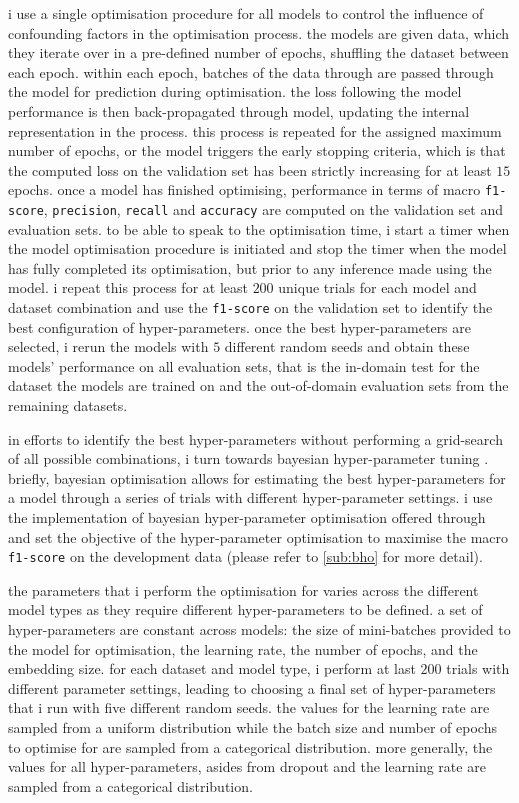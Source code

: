 i use a single optimisation procedure for all models to control the influence of confounding factors in the optimisation process.
the models are given data, which they iterate over in a pre-defined number of epochs, shuffling the dataset between each epoch.
within each epoch, batches of the data through are passed through the model for prediction during optimisation.
the loss following the model performance is then back-propagated through model, updating the internal representation in the process.
this process is repeated for the assigned maximum number of epochs, or the model triggers the early stopping \citep{prechelt:1998} criteria, which is that the computed loss on the validation set has been strictly increasing for at least $15$ epochs.
once a model has finished optimising, performance in terms of macro \texttt{f1-score}, \texttt{precision}, \texttt{recall} and \texttt{accuracy} are computed on the validation set and evaluation sets.
to be able to speak to the optimisation time, i start a timer when the model optimisation procedure is initiated and stop the timer when the model has fully completed its optimisation, but prior to any inference made using the model.
i repeat this process for at least $200$ unique trials for each model and dataset combination and use the \texttt{f1-score} on the validation set to identify the best configuration of hyper-parameters.
once the best hyper-parameters are selected, i rerun the models with $5$ different random seeds and obtain these models' performance on all evaluation sets, that is the in-domain test for the dataset the models are trained on and the out-of-domain evaluation sets from the remaining datasets.

in efforts to identify the best hyper-parameters without performing a grid-search of all possible combinations, i turn towards bayesian hyper-parameter tuning \citep{neal:1996}.
briefly, bayesian optimisation allows for estimating the best hyper-parameters for a model through a series of trials with different hyper-parameter settings.
i use the implementation of bayesian hyper-parameter optimisation offered through \citet{wandb} and set the objective of the hyper-parameter optimisation to maximise the macro \texttt{f1-score} on the development data (please refer to \cref{sub:bho} for more detail).

the parameters that i perform the optimisation for varies across the different model types as they require different hyper-parameters to be defined. 
a set of hyper-parameters are constant across models: the size of mini-batches provided to the model for optimisation, the learning rate, the number of epochs, and the embedding size. 
for each dataset and model type, i perform at last $200$ trials with different parameter settings, leading to choosing a final set of hyper-parameters that i run with five different random seeds.
the values for the learning rate are sampled from a uniform distribution while the batch size and number of epochs to optimise for are sampled from a categorical distribution.
more generally, the values for all hyper-parameters, asides from dropout and the learning rate are sampled from a categorical distribution.

